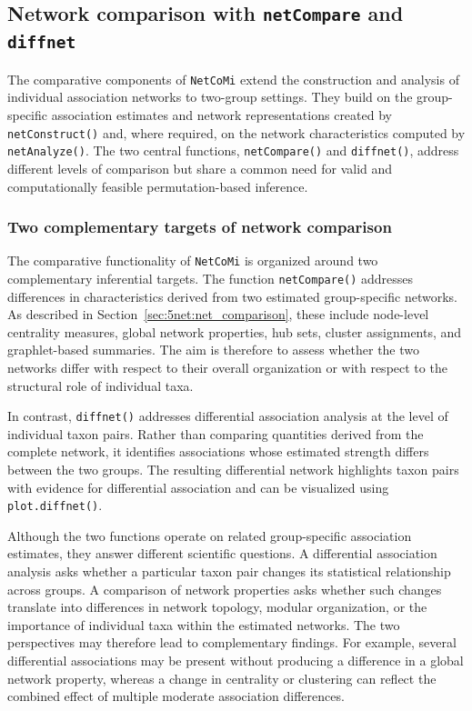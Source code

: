 \subsection{Network comparison with \texttt{netCompare} and \texttt{diffnet}}
\label{sec:5net:workflow_implementation:comparative_inference}

The comparative components of \texttt{NetCoMi} extend the construction and analysis of individual association networks to two-group settings. They build on the group-specific association estimates and network representations created by \texttt{netConstruct()} and, where required, on the network characteristics computed by \texttt{netAnalyze()}. The two central functions, \texttt{netCompare()} and \texttt{diffnet()}, address different levels of comparison but share a common need for valid and computationally feasible permutation-based inference.

\subsubsection*{Two complementary targets of network comparison}

The comparative functionality of \texttt{NetCoMi} is organized around two complementary inferential targets. The function \texttt{netCompare()} addresses differences in characteristics derived from two estimated group-specific networks. As described in Section~\ref{sec:5net:net_comparison}, these include node-level centrality measures, global network properties, hub sets, cluster assignments, and graphlet-based summaries. The aim is therefore to assess whether the two networks differ with respect to their overall organization or with respect to the structural role of individual taxa.

In contrast, \texttt{diffnet()} addresses differential association analysis at the level of individual taxon pairs. Rather than comparing quantities derived from the complete network, it identifies associations whose estimated strength differs between the two groups. The resulting differential network highlights taxon pairs with evidence for differential association and can be visualized using \texttt{plot.diffnet()}.

Although the two functions operate on related group-specific association estimates, they answer different scientific questions. A differential association analysis asks whether a particular taxon pair changes its statistical relationship across groups. A comparison of network properties asks whether such changes translate into differences in network topology, modular organization, or the importance of individual taxa within the estimated networks. The two perspectives may therefore lead to complementary findings. For example, several differential associations may be present without producing a  difference in a global network property, whereas a change in centrality or clustering can reflect the combined effect of multiple moderate association differences.

